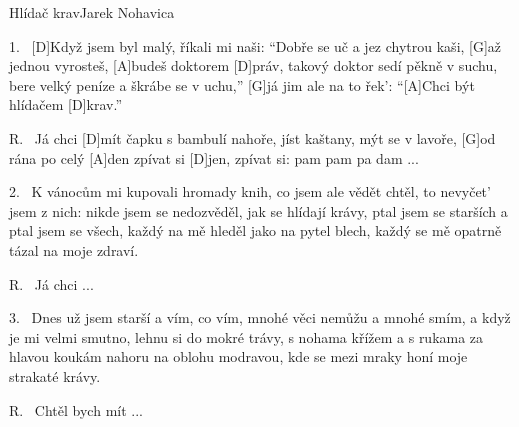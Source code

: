 \begin{song}{Hlídač krav}{Jarek Nohavica}

\begin{xverse}{1.~}
[\large D]Když jsem byl malý, říkali mi naši:
``Dobře se uč a jez chytrou kaši,
[\large G]až jednou vyrosteš, [\large A]budeš doktorem [\large D]práv,
takový doktor sedí pěkně v suchu,
bere velký peníze a škrábe se v uchu,''
[\large G]já jim ale na to řek': ``[\large A]Chci být hlídačem [\large D]krav.''
\end{xverse}

\begin{xverse}{R.~}
Já chci [\large D]mít čapku s bambulí nahoře,
jíst kaštany, mýt se v lavoře,
[\large G]od rána po celý [\large A]den zpívat si [\large D]jen,
zpívat si: pam pam pa dam ...
\end{xverse}

\begin{xverse}{2.~}
K vánocům mi kupovali hromady knih,
co jsem ale vědět chtěl, to nevyčet' jsem z nich:
nikde jsem se nedozvěděl, jak se hlídají krávy,
ptal jsem se starších a ptal jsem se všech,
každý na mě hleděl jako na pytel blech,
každý se mě opatrně tázal na moje zdraví.
\end{xverse}

\begin{xverse}{R.~}
Já chci ...
\end{xverse}

\begin{xverse}{3.~}
Dnes už jsem starší a vím, co vím,
mnohé věci nemůžu a mnohé smím,
a když je mi velmi smutno, lehnu si do mokré trávy,
s nohama křížem a s rukama za hlavou
koukám nahoru na oblohu modravou,
kde se mezi mraky honí moje strakaté krávy.
\end{xverse}

\begin{xverse}{R.~}
Chtěl bych mít ...
\end{xverse}

\end{song}

